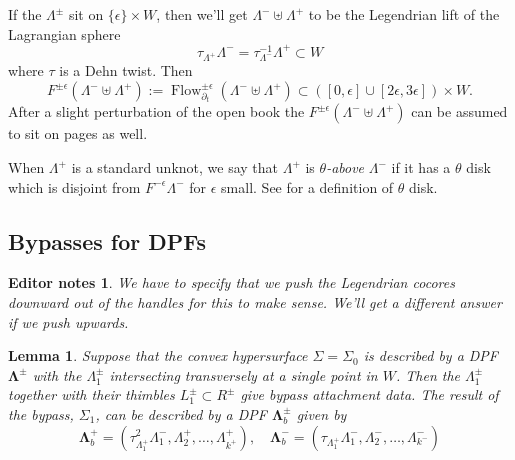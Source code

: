 \documentclass[11pt]{amsart}
\DeclareMathOperator{\Flow}{Flow}
\newcommand{\thicc}[1]{\pmb{#1}}
\newcommand{\Leg}{\Lambda}
\newcommand{\posNegRegion}{R^{\pm}}
\newcommand{\Lag}{L}
\newcommand{\posNegLag}{\Lag^{\pm}}
\newcommand{\posLeg}{\Leg^{+}}
\newcommand{\negLeg}{\Leg^{-}}
\newcommand{\thiccPosLeg}{\thicc{\Leg}^{+}}
\newcommand{\thiccNegLeg}{\thicc{\Leg}^{-}}
\newcommand{\thiccPosNegLeg}{\thicc{\Leg}^{\pm}}
\newcommand{\posNegLeg}{\Leg^{\pm}}
\newtheorem{lemma}[thm]{Lemma}
\newtheorem{edits}[thm]{Editor notes}
\begin{document}
 If the $\posNegLeg$ sit on $\{ \epsilon \} \times W$, then we'll get $\negLeg \uplus \posLeg$ to be the Legendrian lift of the Lagrangian sphere
\begin{equation*}
 \tau_{\posLeg} \negLeg = \tau_{\negLeg}^{-1} \posLeg \subset W
\end{equation*}
where $\tau$ is a Dehn twist. Then
\begin{equation*}
F^{\pm\epsilon}(\negLeg \uplus \posLeg) := \Flow_{\partial_{t}}^{\pm \epsilon}(\negLeg \uplus \posLeg) \subset ([0, \epsilon] \cup [2\epsilon, 3\epsilon]) \times W.
\end{equation*}
After a slight perturbation of the open book the $F^{\pm \epsilon}(\negLeg \uplus \posLeg)$ can be assumed to sit on pages as well.

When $\posLeg$ is a standard unknot, we say that $\posLeg$ is \emph{$\theta$-above} $\negLeg$ if it has a $\theta$ disk which is disjoint from $F^{-\epsilon}\negLeg$ for $\epsilon$ small. See \cite{HH:Bypass} for a definition of $\theta$ disk.

\subsection{Bypasses for DPFs}

\begin{edits}
We have to specify that we push the Legendrian cocores downward out of the handles for this to make sense. We'll get a different answer if we push upwards.
\end{edits}

\begin{lemma}\label{Lemma:OBBypass}
Suppose that the convex hypersurface $\Sigma = \Sigma_{0}$ is described by a DPF $\thiccPosNegLeg$ with the $\posNegLeg_{1}$ intersecting transversely at a single point in $W$. Then the $\posNegLeg_{1}$ together with their thimbles $\posNegLag_{1} \subset \posNegRegion$ give bypass attachment data. The result of the bypass, $\Sigma_{1}$, can be described by a DPF $\thiccPosNegLeg_{b}$ given by
\begin{equation*}
\thiccPosLeg_{b} = (\tau_{\posLeg_{1}}^{2}\negLeg_{1}, \posLeg_{2}, \dots, \posLeg_{k^{+}}), \quad \thiccNegLeg_{b} = (\tau_{\posLeg_{1}}\negLeg_{1}, \negLeg_{2}, \dots, \negLeg_{k^{-}})
\end{equation*}
\end{lemma}
\end{document}
